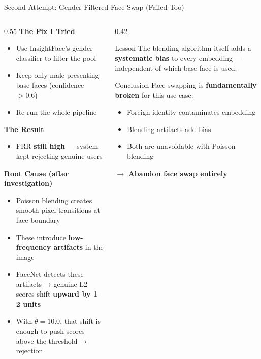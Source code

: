 \documentclass[aspectratio=169]{beamer}
\begin{document}
\begin{frame}{Second Attempt: Gender-Filtered Face Swap (Failed Too)}

\begin{columns}[T]
\begin{column}{0.55\textwidth}
    \textbf{The Fix I Tried}
    \begin{itemize}
        \item Use InsightFace's gender classifier to filter the pool
        \item Keep only male-presenting base faces (confidence $> 0.6$)
        \item Re-run the whole pipeline
    \end{itemize}
    \vspace{8pt}
    \textbf{The Result}
    \begin{itemize}
        \item[\alert{✗}] FRR \textbf{still high} — system kept rejecting genuine users
    \end{itemize}
    \vspace{8pt}
    \textbf{Root Cause (after investigation)}
    \begin{itemize}
        \item Poisson blending creates smooth pixel transitions at face boundary
        \item These introduce \textbf{low-frequency artifacts} in the image
        \item FaceNet detects these artifacts → genuine L2 scores shift \textbf{upward by 1--2 units}
        \item With $\theta = 10.0$, that shift is enough to push scores above the threshold → rejection
    \end{itemize}
\end{column}
\begin{column}{0.42\textwidth}
    \begin{alertblock}{Lesson}
        The blending algorithm itself adds a \textbf{systematic bias} to every embedding — independent of which base face is used.
    \end{alertblock}
    \vspace{10pt}
    \begin{block}{Conclusion}
        Face swapping is \textbf{fundamentally broken} for this use case:
        \begin{itemize}
            \item Foreign identity contaminates embedding
            \item Blending artifacts add bias
            \item Both are unavoidable with Poisson blending
        \end{itemize}
        $\rightarrow$ \textbf{Abandon face swap entirely}
    \end{block}
\end{column}
\end{columns}
\end{frame}
\end{document}
